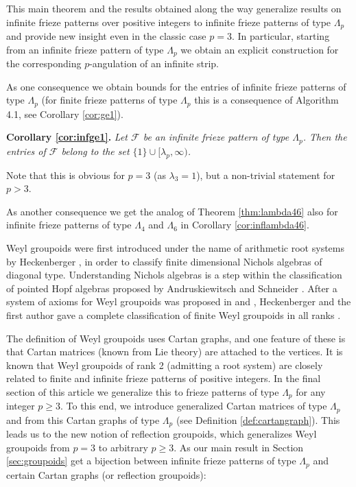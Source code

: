 \documentclass[11pt,a4paper]{amsart}
\theoremstyle{definition}
\numberwithin{equation}{section}
\begin{document}
This main theorem and the results obtained along the way generalize results on infinite frieze
patterns over positive integers to infinite frieze patterns of type $\Lambda_p$ 
and provide new insight even in the classic case $p=3$. In particular, starting from an infinite 
frieze pattern of type $\Lambda_p$ we obtain an explicit
construction for the corresponding $p$-angulation of an infinite strip.  

As one consequence we obtain bounds for the entries of infinite frieze patterns of type $\Lambda_p$
(for finite frieze patterns of type $\Lambda_p$ this is a consequence of Algorithm 4.1, see Corollary 
\ref{cor:ge1}). 
\medskip

\noindent
{\bf Corollary \ref{cor:infge1}.}
{\em Let $\mathcal{F}$ be an infinite frieze pattern of type $\Lambda_p$. Then the entries of $\mathcal{F}$
belong to the set $\{1\}\cup [\lambda_p,\infty)$. 
}
\medskip

Note that this is obvious for $p=3$ (as $\lambda_3=1$), but a non-trivial statement for $p>3$. 
\medskip

As another consequence we get the analog of Theorem \ref{thm:lambda46} also for infinite frieze patterns
of type $\Lambda_4$ and $\Lambda_6$ in Corollary \ref{cor:inflambda46}.
\medskip

Weyl groupoids were first introduced under the name of arithmetic root systems by Heckenberger \cite{p-H-06}, \cite{p-H-09} in order to classify finite dimensional Nichols algebras of diagonal type. Understanding Nichols algebras is a step within the classification of pointed Hopf algebras proposed by Andruskiewitsch and Schneider \cite{AS02}.
After a system of axioms for Weyl groupoids was proposed in \cite{p-HY08} and \cite{p-CH09a}, Heckenberger and the first author gave a complete classification of finite Weyl groupoids in all ranks \cite{CH15}.

The definition of Weyl groupoids uses 
Cartan graphs, and one feature of these is
that Cartan matrices (known from Lie theory)
are attached to the vertices. 
It is known that Weyl groupoids of rank 2 
(admitting a root system) are closely related to 
finite and infinite frieze patterns of positive 
integers. In the final section of this article 
we generalize this to frieze patterns of type
$\Lambda_p$ for any integer $p\ge 3$. To this end,
we introduce generalized Cartan matrices of type
$\Lambda_p$ and from this Cartan graphs of
type $\Lambda_p$ (see Definition \ref{def:cartangraph}). This leads us 
to the new notion of reflection groupoids, 
which generalizes Weyl groupoids from $p=3$ to
arbitrary $p\ge 3$. As our main result in 
Section \ref{sec:groupoids} get a bijection 
between infinite frieze patterns of type $\Lambda_p$
and certain Cartan graphs (or reflection groupoids):
\end{document}
